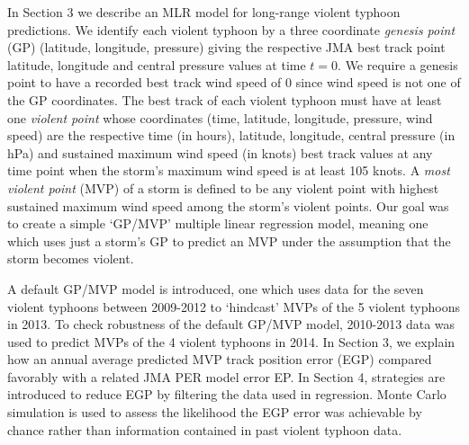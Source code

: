 \documentclass[a4paper, 12pt]{article}
\begin{document}
{   In Section 3 we describe an MLR model for long-range violent typhoon predictions. We identify each violent typhoon by a three coordinate \emph{genesis point} (GP) (latitude, longitude, pressure) giving the respective JMA best track point latitude, longitude and central pressure values at time $t=0$. We require a genesis point to have a recorded best track wind speed of 0 since wind speed is not one of the GP coordinates. The best track of each violent typhoon must have at least one \emph{violent point} whose coordinates (time, latitude, longitude, pressure, wind speed) are the respective time (in hours), latitude, longitude, central pressure (in hPa) and sustained maximum wind speed (in knots) best track values at any time point when the storm's maximum wind speed is at least 105 knots. A \emph{most violent point} (MVP) of a storm is defined to be any violent point with highest sustained maximum wind speed among the storm's violent points. Our goal was to create a simple `GP/MVP' multiple linear regression model, meaning one which uses just a storm's GP to predict an MVP under the assumption that the storm becomes violent.
   
   A default GP/MVP model is introduced, one which uses data for the seven violent typhoons between 2009-2012 to `hindcast'  MVPs of the 5 violent typhoons in 2013. To check robustness of the default GP/MVP model, 2010-2013 data was used to predict MVPs of the 4 violent typhoons in 2014.   In Section 3, we explain how an annual average predicted MVP track position error (EGP) compared favorably with a related JMA PER model error EP. In Section 4, strategies are introduced to reduce EGP by filtering the data used in regression. Monte Carlo simulation is used to assess the likelihood the EGP error was achievable by chance rather than information contained in past violent typhoon data.

}
\end{document}
